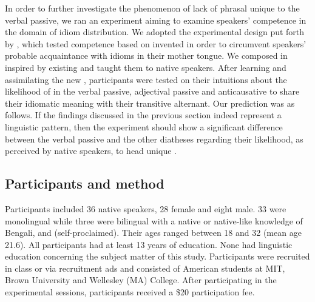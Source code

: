 \documentclass[output=paper]{langsci/langscibook}
\begin{document}
In order to further investigate the phenomenon of lack of phrasal  unique
to the verbal passive, we ran an experiment aiming to examine speakers’
competence in the domain of idiom distribution. We adopted the experimental
design put forth by \textcite{SilHorKluWex2018}, which tested competence based
on invented  in order to circumvent speakers’ probable acquaintance with
idioms in their mother tongue. We composed  in  inspired by
existing   and taught them to native  speakers. After
learning and assimilating the new , participants were tested on their
intuitions about the likelihood of  in the verbal passive, adjectival
passive and anticausative to share their idiomatic meaning with their
transitive alternant. Our prediction was as follows. If the findings discussed
in the previous section indeed represent a linguistic pattern, then the
experiment should show a significant difference between the verbal passive and
the other diatheses regarding their likelihood, as perceived by native
speakers, to head unique .

\subsection{Participants and method} %

Participants included 36 native  speakers, 28 female and eight male.
33 were monolingual while three were bilingual with a native or native-like
knowledge of Bengali,  and  (self-proclaimed). Their
ages ranged be\-tween 18 and 32 (mean age 21.6).  All participants had at least
13 years of education.  None had linguistic education concerning the subject
matter of this study.  Participants were recruited in class or via recruitment
ads and consisted of American students at MIT, Brown University and Wellesley
(MA) College. After participating in the experimental sessions, participants
received a \$20 participation fee.
\end{document}

